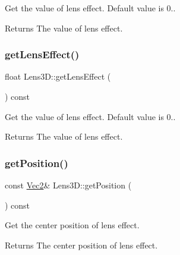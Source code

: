 Get the value of lens effect. Default value is 0.. 

\begin{DoxyReturn}{Returns}
The value of lens effect. 
\end{DoxyReturn}
\mbox{\label{classLens3D_ac8fca5cf505e98c77be66bfbf9483438}} 
\subsubsection{\texorpdfstring{get\+Lens\+Effect()}{getLensEffect()}\hspace{0.1cm}{\footnotesize\ttfamily [2/2]}}
{\footnotesize\ttfamily float Lens3\+D\+::get\+Lens\+Effect (\begin{DoxyParamCaption}{ }\end{DoxyParamCaption}) const\hspace{0.3cm}{\ttfamily [inline]}}



Get the value of lens effect. Default value is 0.. 

\begin{DoxyReturn}{Returns}
The value of lens effect. 
\end{DoxyReturn}
\mbox{\label{classLens3D_ad4981a40ade698e4a98bc2f1196810aa}} 
\subsubsection{\texorpdfstring{get\+Position()}{getPosition()}\hspace{0.1cm}{\footnotesize\ttfamily [1/2]}}
{\footnotesize\ttfamily const \hyperlink{classVec2}{Vec2}\& Lens3\+D\+::get\+Position (\begin{DoxyParamCaption}{ }\end{DoxyParamCaption}) const\hspace{0.3cm}{\ttfamily [inline]}}



Get the center position of lens effect. 

\begin{DoxyReturn}{Returns}
The center position of lens effect. 
\end{DoxyReturn}
\mbox{\label{classLens3D_ad4981a40ade698e4a98bc2f1196810aa}} 
